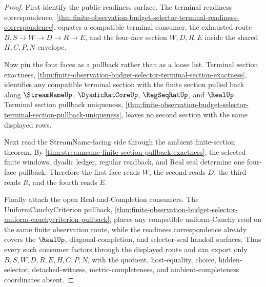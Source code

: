 \begin{proof}
First identify the public readiness surface. The terminal readiness correspondence, \autoref{thm:finite-observation-budget-selector-terminal-readiness-correspondence}, equates a compatible terminal consumer, the exhausted route $B,S \to W \to D \to R \to E$, and the four-face section $W,D,R,E$ inside the shared $H,C,P,N$ envelope.

Now pin the four faces as a pullback rather than as a loose list. Terminal section exactness, \autoref{thm:finite-observation-budget-selector-terminal-section-exactness}, identifies any compatible terminal section with the finite section pulled back along $\StreamNameUp$, $\DyadicRatCoreUp$, $\RegSeqRatUp$, and $\RealUp$. Terminal section pullback uniqueness, \autoref{thm:finite-observation-budget-selector-terminal-section-pullback-uniqueness}, leaves no second section with the same displayed rows.

Next read the StreamName-facing side through the ambient finite-section theorem. By \autoref{thm:streamname-finite-section-pullback-exactness}, the selected finite windows, dyadic ledger, regular readback, and Real seal determine one four-face pullback. Therefore the first face reads $W$, the second reads $D$, the third reads $R$, and the fourth reads $E$.

Finally attach the open Real-and-Completion consumers. The UniformCauchyCriterion pullback, \autoref{thm:finite-observation-budget-selector-uniform-cauchycriterion-pullback}, places any compatible uniform-Cauchy read on the same finite observation route, while the readiness correspondence already covers the $\RealUp$, diagonal-completion, and selector-seal handoff surfaces. Thus every such consumer factors through the displayed route and can export only $B,S,W,D,R,E,H,C,P,N$, with the quotient, host-equality, choice, hidden-selector, detached-witness, metric-completeness, and ambient-completeness coordinates absent.
\end{proof}


